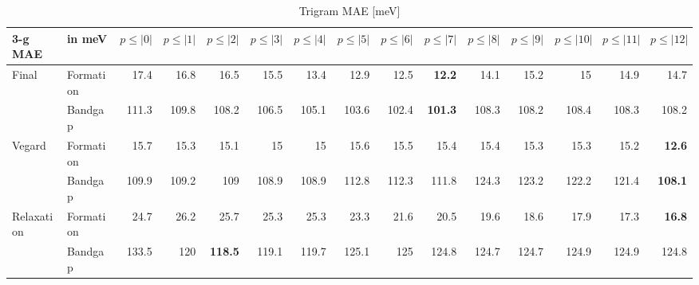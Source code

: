 \documentclass[11pt,oneside,czech,american]{book} %
\theoremstyle{definition} %
\theoremstyle{definition}
\begin{document}
\begin{table}[H]
	\scriptsize
	\centering
\begin{tabular}{llrrrrrrrrrrrrr}
	\hline
	3-g MAE    & in meV    &   $p{\leq}|0|$ &   $p{\leq}|1|$ &   $p{\leq}|2|$ &   $p{\leq}|3|$ &   $p{\leq}|4|$ &   $p{\leq}|5|$ &   $p{\leq}|6|$ &   $p{\leq}|7|$ &   $p{\leq}|8|$ &   $p{\leq}|9|$ &   $p{\leq}|10|$ &   $p{\leq}|11|$ &   $p{\leq}|12|$ \\
	\hline
	\multirow{2}{*}{Final}      & Formation &       17.4 &       16.8 &       16.5 &       15.5 &       13.4 &       12.9 &       12.5 &       \textbf{12.2} &       14.1 &       15.2 &        15   &        14.9 &        14.7 \\
	      & Bandgap   &      111.3 &      109.8 &      108.2 &      106.5 &      105.1 &      103.6 &      102.4 &      \textbf{101.3} &      108.3 &      108.2 &       108.4 &       108.3 &       108.2 \\
	\multirow{2}{*}{Vegard}     & Formation &       15.7 &       15.3 &       15.1 &       15   &       15   &       15.6 &       15.5 &       15.4 &       15.4 &       15.3 &        15.3 &        15.2 &        \textbf{12.6} \\
	     & Bandgap   &      109.9 &      109.2 &      109   &      108.9 &      108.9 &      112.8 &      112.3 &      111.8 &      124.3 &      123.2 &       122.2 &       121.4 &       \textbf{108.1} \\
	\multirow{2}{*}{Relaxation} & Formation &       24.7 &       26.2 &       25.7 &       25.3 &       25.3 &       23.3 &       21.6 &       20.5 &       19.6 &       18.6 &        17.9 &        17.3 &        \textbf{16.8} \\
	 & Bandgap   &      133.5 &      120   &      \textbf{118.5} &      119.1 &      119.7 &      125.1 &      125   &      124.8 &      124.7 &      124.7 &       124.9 &       124.9 &       124.8 \\
	\hline
\end{tabular}
	\caption{Trigram MAE [meV]}
	\label{3-g MAE hat}
\end{table}
\end{document}
